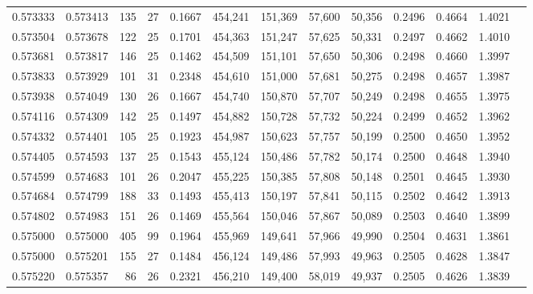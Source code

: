 \begin{tabular}{rrrrrrrrrrrrr}
0.573333 & 0.573413 &    135 &    27 &                                     0.1667 & 454,241 & 151,369 &  57,600 &  50,356 & 0.2496 & 0.4664 & 1.4021 \\
0.573504 & 0.573678 &    122 &    25 &                                     0.1701 & 454,363 & 151,247 &  57,625 &  50,331 & 0.2497 & 0.4662 & 1.4010 \\
0.573681 & 0.573817 &    146 &    25 &                                     0.1462 & 454,509 & 151,101 &  57,650 &  50,306 & 0.2498 & 0.4660 & 1.3997 \\
0.573833 & 0.573929 &    101 &    31 &                                     0.2348 & 454,610 & 151,000 &  57,681 &  50,275 & 0.2498 & 0.4657 & 1.3987 \\
0.573938 & 0.574049 &    130 &    26 &                                     0.1667 & 454,740 & 150,870 &  57,707 &  50,249 & 0.2498 & 0.4655 & 1.3975 \\
0.574116 & 0.574309 &    142 &    25 &                                     0.1497 & 454,882 & 150,728 &  57,732 &  50,224 & 0.2499 & 0.4652 & 1.3962 \\
0.574332 & 0.574401 &    105 &    25 &                                     0.1923 & 454,987 & 150,623 &  57,757 &  50,199 & 0.2500 & 0.4650 & 1.3952 \\
0.574405 & 0.574593 &    137 &    25 &                                     0.1543 & 455,124 & 150,486 &  57,782 &  50,174 & 0.2500 & 0.4648 & 1.3940 \\
0.574599 & 0.574683 &    101 &    26 &                                     0.2047 & 455,225 & 150,385 &  57,808 &  50,148 & 0.2501 & 0.4645 & 1.3930 \\
0.574684 & 0.574799 &    188 &    33 &                                     0.1493 & 455,413 & 150,197 &  57,841 &  50,115 & 0.2502 & 0.4642 & 1.3913 \\
0.574802 & 0.574983 &    151 &    26 &                                     0.1469 & 455,564 & 150,046 &  57,867 &  50,089 & 0.2503 & 0.4640 & 1.3899 \\
0.575000 & 0.575000 &    405 &    99 &                                     0.1964 & 455,969 & 149,641 &  57,966 &  49,990 & 0.2504 & 0.4631 & 1.3861 \\
0.575000 & 0.575201 &    155 &    27 &                                     0.1484 & 456,124 & 149,486 &  57,993 &  49,963 & 0.2505 & 0.4628 & 1.3847 \\
0.575220 & 0.575357 &     86 &    26 &                                     0.2321 & 456,210 & 149,400 &  58,019 &  49,937 & 0.2505 & 0.4626 & 1.3839 \\

\end{tabular}
